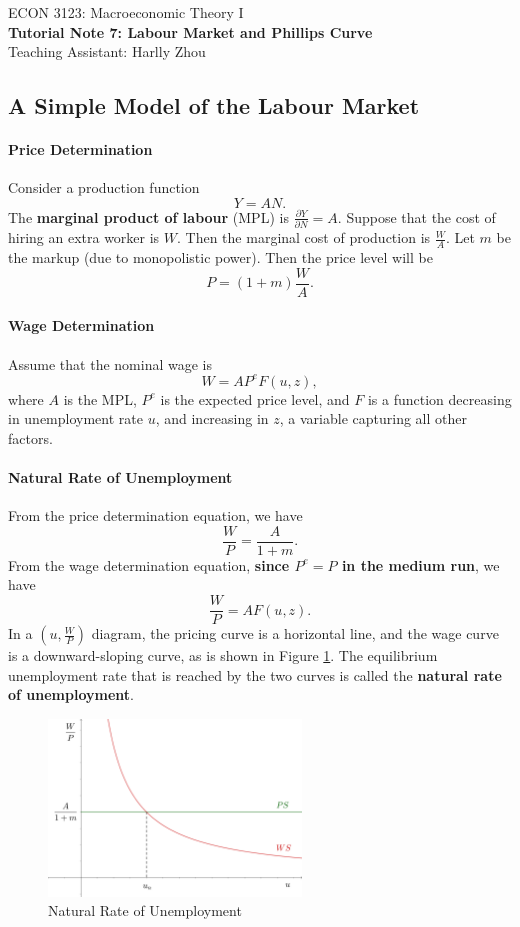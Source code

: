 \documentclass[12pt]{article}
\begin{document}
\begin{center}
    ECON 3123: Macroeconomic Theory I\\
    {\large \textbf{Tutorial Note 7: Labour Market and Phillips Curve}}\\
    Teaching Assistant: Harlly Zhou
\end{center}

\subsection*{A Simple Model of the Labour Market}
\paragraph{Price Determination} Consider a production function
\[Y = AN.\]
The \textbf{marginal product of labour} (MPL) is $\frac{\partial Y}{\partial N} = A$. Suppose that the cost of hiring an extra worker is $W$. Then the marginal cost of production is $\frac{W}{A}$. Let $m$ be the markup (due to monopolistic power). Then the price level will be
\[ P = (1+m)\frac{W}{A}.\]

\paragraph{Wage Determination} Assume that the nominal wage is
\[W = A P^e F(u,z),\]
where $A$ is the MPL, $P^e$ is the expected price level, and $F$ is a function decreasing in unemployment rate $u$, and increasing in $z$, a variable capturing all other factors.

\paragraph{Natural Rate of Unemployment} From the price determination equation, we have
\[\frac{W}{P} = \frac{A}{1+m}.\]
From the wage determination equation, \textbf{since $P^e=P$ in the medium run}, we have
\[\frac{W}{P} = AF(u,z).\]
In a $\left(u, \frac{W}{P}\right)$ diagram, the pricing curve is a horizontal line, and the wage curve is a downward-sloping curve, as is shown in Figure \ref{fig:wu_01}. The equilibrium unemployment rate that is reached by the two curves is called the \textbf{natural rate of unemployment}.

\begin{figure}[htp]
    \centering
    \includegraphics[width=0.6\textwidth]{wu_01.png}
    \caption{Natural Rate of Unemployment}
    \label{fig:wu_01}
\end{figure}
\end{document}

